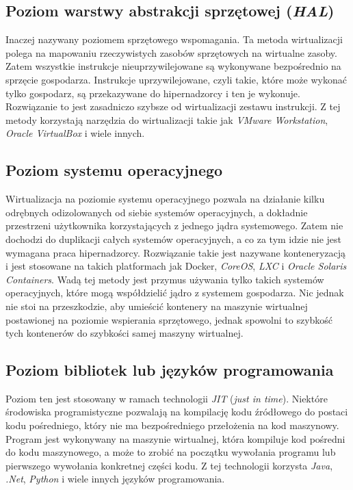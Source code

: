 \documentclass[polish, a4paper, 12pt, oneside]{book}
\begin{document}
	\subsection {Poziom warstwy abstrakcji sprzętowej (\textit{HAL})}
	Inaczej nazywany poziomem sprzętowego wspomagania. Ta metoda wirtualizacji polega na mapowaniu rzeczywistych zasobów sprzętowych na wirtualne zasoby. Zatem wszystkie instrukcje nieuprzywilejowane są wykonywane bezpośrednio na sprzęcie gospodarza. Instrukcje uprzywilejowane, czyli takie, które może wykonać tylko gospodarz, są przekazywane do hipernadzorcy i ten je wykonuje. Rozwiązanie to jest zasadniczo szybsze od wirtualizacji zestawu instrukcji. Z tej metody korzystają narzędzia do wirtualizacji takie jak \textit{VMware Workstation}\cite{vmwareworkstation}, \textit{Oracle VirtualBox}\cite{virtualbox} i wiele innych.
	\subsection {Poziom systemu operacyjnego}
	Wirtualizacja na poziomie systemu operacyjnego pozwala na działanie kilku odrębnych odizolowanych od siebie systemów operacyjnych, a dokładnie przestrzeni użytkownika korzystających z jednego jądra systemowego. Zatem nie dochodzi do duplikacji całych systemów operacyjnych, a co za tym idzie nie jest wymagana praca hipernadzorcy. Rozwiązanie takie jest nazywane konteneryzacją i jest stosowane na takich platformach jak Docker, \textit{CoreOS}\cite{coreos}, \textit{LXC}\cite{lxc} i \textit{Oracle Solaris Containers}\cite{solaris}. Wadą tej metody jest przymus używania tylko takich systemów operacyjnych, które mogą współdzielić jądro z systemem gospodarza. Nic jednak nie stoi na przeszkodzie, aby umieścić kontenery na maszynie wirtualnej postawionej na poziomie wspierania sprzętowego, jednak spowolni to szybkość tych kontenerów do szybkości samej maszyny wirtualnej. 
	\subsection {Poziom bibliotek lub języków programowania}
	Poziom ten jest stosowany w ramach technologii \textit{JIT} (\textit{just in time}). Niektóre środowiska programistyczne pozwalają na kompilację kodu źródłowego do postaci kodu pośredniego, który nie ma bezpośredniego przełożenia na kod maszynowy. Program jest wykonywany na maszynie wirtualnej, która kompiluje kod pośredni do kodu maszynowego, a może to zrobić na początku wywołania programu lub pierwszego wywołania konkretnej części kodu. Z tej technologii korzysta \textit{Java}\cite{java}, \textit{.Net}\cite{dotnet}, \textit{Python}\cite{python} i wiele innych języków programowania. 
\end{document}
